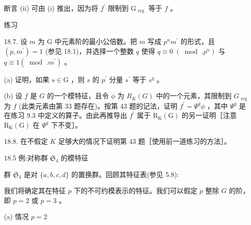 \documentclass[10pt]{article}
\begin{document}
断言 (ii) 可由 (i) 推出，因为将 \({f}^{\prime }\) 限制到 \({\mathrm{G}}_{\text{ reg }}\) 等于 \(f\) 。

练习

18.7. 设 \(m\) 为 G 中元素阶的最小公倍数。把 \(m\) 写成 \({p}^{n}{m}^{\prime }\) 的形式，且 \(\left( {p,{m}^{\prime }}\right)  = 1\) (参见 18.1)，并选择一个整数 \(q\) 使得 \(q \equiv  0 \; \left( {{\;\operatorname{mod}\;.}{p}^{n}}\right)\) 与 \(q \equiv  1\left( {{\;\operatorname{mod}\;.}{m}^{\prime }}\right)\) 。

(a) 证明，如果 \(s \in  \mathrm{G}\) ，则 \(s\) 的 \({p}^{\prime }\) 分量 \({s}^{\prime }\) 等于 \({s}^{q}\) 。

(b) 设 \(f\) 是 \(G\) 的一个模特征，且令 \(\phi\) 为 \({R}_{K}\left( G\right)\) 中的一个元素，其限制到 \({G}_{\text{ reg }}\) 为 \(f\) (此类元素由第 33 题存在)。按第 43 题的记法，证明 \({f}^{\prime } = {\Psi }^{q}\phi\) ，其中 \({\Psi }^{q}\) 是在练习 9.3 中定义的算子。由此再推导出 \({f}^{\prime }\) 属于 \({\mathrm{R}}_{\mathrm{K}}\left( \mathrm{G}\right)\) 的另一证明［注意 \({\mathrm{R}}_{\mathrm{K}}\left( \mathrm{G}\right)\) 在 \({\Psi }^{q}\) 下不变］。

18.8. 在不假定 \(K\) 足够大的情况下证明第 43 题［使用前一道练习的方法］。

18.5 例:对称群 \({\mathfrak{S}}_{4}\) 的模特征

群 \({\mathfrak{S}}_{4}\) 是对 \(\{ a,b,c,d\}\) 的置换群。回顾其特征表(参见 5.8):

\begin{center}
\end{center}

我们将确定其在特征 \(p\) 下的不可约模表示的特征。我们可以假定 \(p\) 整除 \(G\) 的阶，即 \(p = 2\) 或 \(p = 3\) 。

(a) 情况 \(p = 2\)
\end{document}
